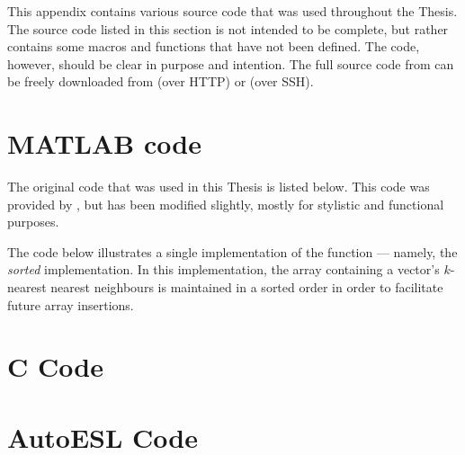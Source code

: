 This appendix contains various source code that was used throughout the Thesis.
The source code listed in this section is not intended to be complete, but
rather contains some macros and functions that have not been defined. The code,
however, should be clear in purpose and intention. The full source code from can
be freely downloaded from \gitRepoHTTP{} (over HTTP) or \gitRepoSSH{} (over
SSH).

\section{MATLAB code}
\label{sourceCode:matlab}
The original  code that was used in this Thesis is listed
below. This code was provided by \citeauthor{Khoa:2012}, but has been modified
slightly, mostly for stylistic and functional purposes.

The code below illustrates a single implementation of the
 function --- namely, the \emph{sorted}
implementation. In this implementation, the array containing a vector's
$k$-nearest nearest neighbours is maintained in a sorted order in order to
facilitate future array insertions.



\section{C Code}
\label{sourceCode:c}


\section{AutoESL Code}
\label{sourceCode:autoesl}
